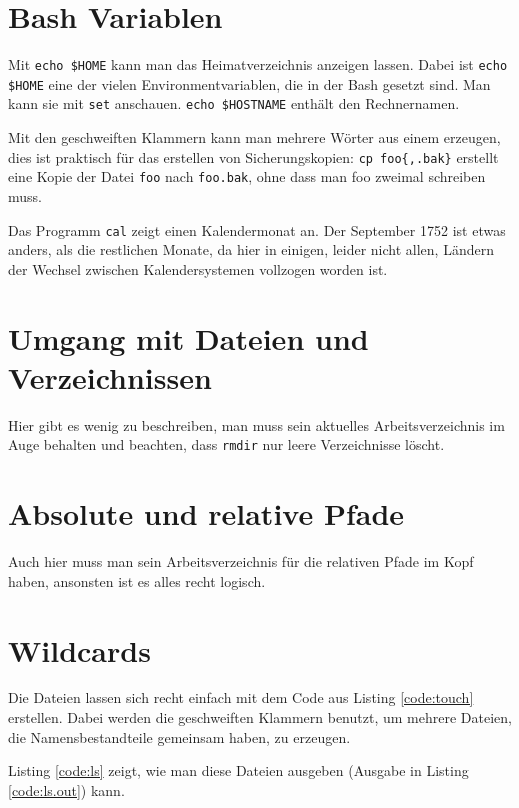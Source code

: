 \section{Bash Variablen}

Mit \texttt{echo \${HOME}} kann man das Heimatverzeichnis anzeigen lassen. Dabei ist \texttt{echo \$HOME} eine der vielen Environmentvariablen, die in der Bash gesetzt sind. Man kann sie mit \texttt{set} anschauen. \texttt{echo \${HOSTNAME}} enthält den Rechnernamen.

Mit den geschweiften Klammern kann man mehrere Wörter aus einem erzeugen, dies ist praktisch für das erstellen von Sicherungskopien: \verb#cp foo{,.bak}# erstellt eine Kopie der Datei \texttt{foo} nach \texttt{foo.bak}, ohne dass man foo zweimal schreiben muss.

Das Programm \texttt{cal} zeigt einen Kalendermonat an. Der September 1752 ist etwas anders, als die restlichen Monate, da hier in einigen, leider nicht allen, Ländern der Wechsel zwischen Kalendersystemen vollzogen worden ist.

\section{Umgang mit Dateien und Verzeichnissen}

Hier gibt es wenig zu beschreiben, man muss sein aktuelles Arbeitsverzeichnis im Auge behalten und beachten, dass \texttt{rmdir} nur leere Verzeichnisse löscht.

\section{Absolute und relative Pfade}

Auch hier muss man sein Arbeitsverzeichnis für die relativen Pfade im Kopf haben, ansonsten ist es alles recht logisch.

\section{Wildcards}

Die Dateien lassen sich recht einfach mit dem Code aus Listing \ref{code:touch} erstellen. Dabei werden die geschweiften Klammern benutzt, um mehrere Dateien, die Namensbestandteile gemeinsam haben, zu erzeugen.


Listing \ref{code:ls} zeigt, wie man diese Dateien ausgeben (Ausgabe in Listing \ref{code:ls.out}) kann.

